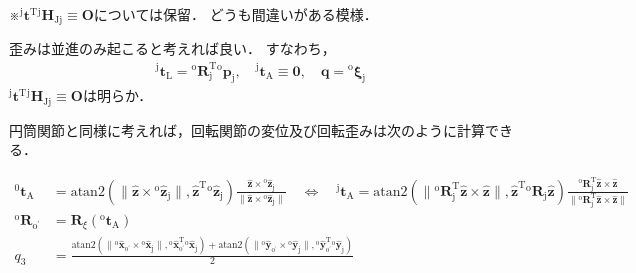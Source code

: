 ﻿\documentclass[a4paper]{jsarticle}
\begin{document}
※${}^{\mathrm{j}}\bm{t}^{\mathrm{T}}{}^{\mathrm{j}}\bm{H}_{\mathrm{Jj}}\equiv\bm{O}$については保留．
どうも間違いがある模様．


\vspace{\baselineskip}


歪みは並進のみ起こると考えれば良い．
すなわち，
\begin{align*}
{}^{\mathrm{j}}\bm{t}_{\mathrm{L}}={}^{\mathrm{o}}\bm{R}_{\mathrm{j}}^{\mathrm{T}}{}^{\mathrm{o}}\bm{p}_{\mathrm{j}},\quad
{}^{\mathrm{j}}\bm{t}_{\mathrm{A}}\equiv\bm{0},\quad
\bm{q}={}^{\mathrm{o}}\bm{\xi}_{\mathrm{j}}
\end{align*}
${}^{\mathrm{j}}\bm{t}^{\mathrm{T}}{}^{\mathrm{j}}\bm{H}_{\mathrm{Jj}}\equiv\bm{O}$は明らか．


\vspace{\baselineskip}


円筒関節と同様に考えれば，回転関節の変位及び回転歪みは次のように計算できる．

\begin{align*}
{}^{0}\bm{t}_{\mathrm{A}}
&=\mathrm{atan2}(\|\hat{\bm{z}}\times{}^{\mathrm{o}}\hat{\bm{z}}_{\mathrm{j}}\|,\hat{\bm{z}}^{\mathrm{T}}{}^{\mathrm{o}}\hat{\bm{z}}_{\mathrm{j}})
\frac{\hat{\bm{z}}\times{}^{\mathrm{o}}\hat{\bm{z}}_{\mathrm{j}}}{\|\hat{\bm{z}}\times{}^{\mathrm{o}}\hat{\bm{z}}_{\mathrm{j}}\|}
\quad\Leftrightarrow\quad
{}^{\mathrm{j}}\bm{t}_{\mathrm{A}}
=\mathrm{atan2}(\|{}^{\mathrm{o}}\bm{R}_{\mathrm{j}}^{\mathrm{T}}\hat{\bm{z}}\times\hat{\bm{z}}\|,\hat{\bm{z}}^{\mathrm{T}}{}^{\mathrm{o}}\bm{R}_{\mathrm{j}}\hat{\bm{z}})
\frac{{}^{\mathrm{o}}\bm{R}_{\mathrm{j}}^{\mathrm{T}}\hat{\bm{z}}\times\hat{\bm{z}}}
     {\|{}^{\mathrm{o}}\bm{R}_{\mathrm{j}}^{\mathrm{T}}\hat{\bm{z}}\times\hat{\bm{z}}\|}
\\
{}^{\mathrm{o}}\bm{R}_{\mathrm{o}^{\prime}}&=\bm{R}_{\xi}({}^{\mathrm{o}}\bm{t}_{\mathrm{A}})
\\
q_{3}&=\frac{
 \mathrm{atan2}(\|{}^{\mathrm{o}}\hat{\bm{x}}_{\mathrm{o}^{\prime}}\times{}^{\mathrm{o}}\hat{\bm{x}}_{\mathrm{j}}\|,
        {}^{\mathrm{o}}\hat{\bm{x}}_{\mathrm{o}^{\prime}}^{\mathrm{T}}{}^{\mathrm{o}}\hat{\bm{x}}_{\mathrm{j}})
+\mathrm{atan2}(\|{}^{\mathrm{o}}\hat{\bm{y}}_{\mathrm{o}^{\prime}}\times{}^{\mathrm{o}}\hat{\bm{y}}_{\mathrm{j}}\|,
        {}^{\mathrm{o}}\hat{\bm{y}}_{\mathrm{o}^{\prime}}^{\mathrm{T}}{}^{\mathrm{o}}\hat{\bm{y}}_{\mathrm{j}})
 }{2}
\end{align*}
\end{document}
